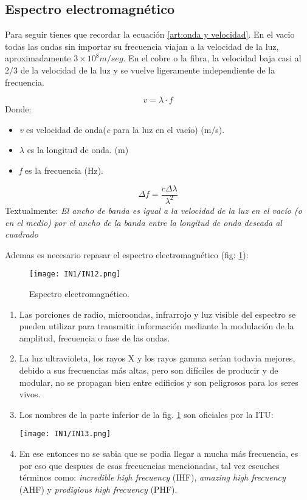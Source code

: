 \documentclass[
	12pt, %
	fleqn, %
	a4paper, %
]{LegrandOrangeBook}
\begin{document}
\subsection{Espectro electromagnético}
Para seguir tienes que recordar la ecuación \ref{art:onda y velocidad}. En el vacio todas las ondas sin importar su frecuencia viajan a la velocidad de la luz, aproximadamente \textbf{$3\times 10^8m/seg$}. En el cobre o la fibra, la velocidad baja casi al 2/3 de la velocidad de la luz y se vuelve ligeramente independiente de la frecuencia.\\
\begin{definition}
\begin{equation}
\label{eq: onda y velocidad}
v=\lambda\cdot f
\end{equation}
Donde:
\begin{itemize}
\item \textit{v} es velocidad de onda(\textit{c} para la luz en el vacío) (m/s).
\item $\lambda$ es la longitud de onda. (m)
\item \textit{f} es la frecuencia (Hz).
\end{itemize}
\end{definition}
\begin{definition}
\begin{equation}
\Delta f=\frac{c\Delta\lambda}{\lambda^2}
\label{eq: ancho de banda y onda}
\end{equation}
Textualmente: \textit{El ancho de banda es igual a la velocidad de la luz en el vacío (o en el medio) por el ancho de la banda entre la longitud de onda deseada al cuadrado}
\end{definition}
Ademas es necesario repasar el espectro electromagnético (fig: \ref{fig:espectro electro}):
\begin{figure}[]
\centering
\texttt{[image: IN1/IN12.png]}
\caption{Espectro electromagnético.}
\label{fig:espectro electro}
\end{figure}
\begin{enumerate}
\item Las porciones de radio, microondas, infrarrojo y luz visible del espectro se pueden utilizar para transmitir información mediante la modulación de la amplitud, frecuencia o fase de las ondas.
\item La luz ultravioleta, los rayos X y los rayos gamma serían todavía mejores, debido a sus frecuencias más altas, pero son difíciles de producir y de modular, no se propagan bien entre edificios y son peligrosos para los seres vivos.
\item Los nombres de la parte inferior de la fig. \ref{fig:espectro electro} son oficiales por la ITU:
\begin{center}
\texttt{[image: IN1/IN13.png]}
\end{center}
\item En ese entonces no se sabia que se podia llegar a mucha más frecuencia, es por eso que despues de esas frecuencias mencionadas, tal vez escuches términos como: \textit{incredible high frecuency} (IHF), \textit{amazing high frecuency} (AHF) y \textit{prodigious high frecuency} (PHF).
\end{enumerate}
\end{document}

